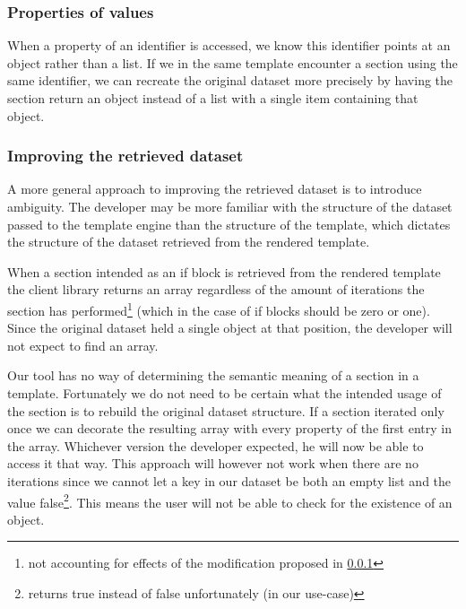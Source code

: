 \documentclass[thesis.tex]{subfiles}
\begin{document}
\subsubsection{Properties of values}
\label{sec:flatten-section}
When a property of an identifier is accessed, we know this identifier points at
an object rather than a list. If we in the same template encounter a section
using the same identifier, we can recreate the original dataset more precisely
by having the section return an object instead of a list with a single item
containing that object.

\subsubsection{Improving the retrieved dataset}
A more general approach to improving the retrieved dataset is to introduce
ambiguity. The developer may be more familiar with the structure of the dataset
passed to the template engine than the structure of the template, which dictates
the structure of the dataset retrieved from the rendered template.

When a section intended as an if block is retrieved from the rendered template
the client library returns an array regardless of the amount of iterations the
section has performed\footnote{
	not accounting for effects of the modification proposed in \ref{sec:flatten-section}
} (which in the case of if blocks should be zero or one).
Since the original dataset held a single object at that position,
the developer will not expect to find an array.

Our tool has no way of determining the semantic meaning of a section in a
template.
Fortunately we do not need to be certain what the intended usage of the section
is to rebuild the original dataset structure.
If a section iterated only once we can decorate the resulting array with every
property of the first entry in the array. Whichever version the developer
expected, he will now be able to access it that way. This approach will however
not work when there are no iterations since we cannot let a key in our dataset
be both an empty list and the value false\footnote{
	\inline{\!\![]} returns true instead of false unfortunately (in our use-case)
}. This means the user will not be able to check for the existence of an object.

\end{document}
